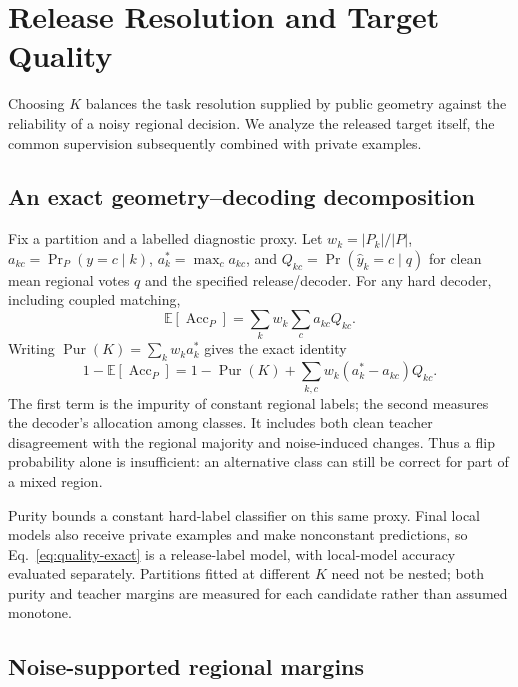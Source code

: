 \section{Release Resolution and Target Quality}
\label{sec:quality}

Choosing $K$ balances the task resolution supplied by public geometry against
the reliability of a noisy regional decision. We analyze the released target
itself, the common supervision subsequently combined with private examples.

\subsection{An exact geometry--decoding decomposition}

Fix a partition and a labelled diagnostic proxy. Let $w_k=|P_k|/|P|$,
$a_{kc}=\Pr_P(y=c\mid k)$, $a_k^*=\max_c a_{kc}$, and
$Q_{kc}=\Pr(\hat y_k=c\mid q)$ for clean mean regional votes $q$ and the
specified release/decoder. For any hard decoder, including coupled matching,
\begin{equation}
\mathbb E[\operatorname{Acc}_{P}]=\sum_k w_k\sum_c a_{kc}Q_{kc}.
\label{eq:quality-exact}
\end{equation}
Writing $\operatorname{Pur}(K)=\sum_k w_ka_k^*$ gives the exact identity
\begin{equation}
1-\mathbb E[\operatorname{Acc}_{P}]
=1-\operatorname{Pur}(K)+\sum_{k,c}w_k(a_k^*-a_{kc})Q_{kc}.
\label{eq:quality-decomposition}
\end{equation}
The first term is the impurity of constant regional labels; the second
measures the decoder's allocation among classes. It includes both clean
teacher disagreement with the regional majority and noise-induced changes.
Thus a flip probability alone is insufficient: an alternative class can
still be correct for part of a mixed region.

Purity bounds a constant hard-label classifier on this same proxy.
Final local models also receive private examples and make nonconstant
predictions, so Eq.~\eqref{eq:quality-exact} is a release-label model, with
local-model accuracy evaluated separately. Partitions fitted at different
$K$ need not be nested; both purity and teacher margins are measured for each
candidate rather than assumed monotone.

\subsection{Noise-supported regional margins}


